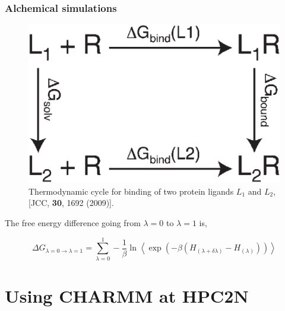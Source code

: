 \documentclass{beamer}
\begin{document}
\begin{frame}
\frametitle{Alchemical simulations}


\begin{figure}
\includegraphics[scale=0.08]{alchemical.eps}
\caption{{\scriptsize  Thermodynamic cycle for binding of two protein ligands $L_1$ and $L_2$,
[JCC, {\bf 30}, 1692 (2009)]. }}
\end{figure}

The free energy difference going from $\lambda=0$ to $\lambda=1$ is,


\begin{equation}                                                                                                                                            
	\Delta G _{\lambda=0 \rightarrow \lambda=1 } = \sum_{\lambda=0}^{1} -\frac{1}{\beta}
	\ln \left< \exp \left( -\beta (H_{(\lambda+\delta \lambda)} - H_{(\lambda)}   )   \right) \right>
\end{equation}

\end{frame}

%
% 

\section{Using CHARMM at HPC2N}
\end{document}
